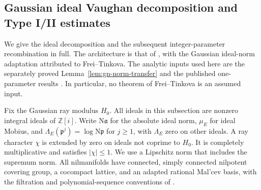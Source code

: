 \subsection{Gaussian ideal Vaughan decomposition and Type I/II estimates}
\label{gi-section}

We give the ideal decomposition and the subsequent integer-parameter
recombination in full.  The architecture is that of
\cite[Section~3]{moebius}, with the Gaussian ideal-norm adaptation
attributed to Frei--Tinkova.  The analytic inputs used here are the
separately proved Lemma~\ref{lem:gn-norm-transfer} and the published
one-parameter results \cite[Theorem~2.9 and Lemma~4.5]{GTOrbits2012}.
In particular, no theorem of Frei--Tinkova is an assumed input.

Fix the Gaussian ray modulus $H_0$.  All ideals in this subsection are
nonzero integral ideals of $\mathbb Z[i]$.  Write $\mathrm N\mathfrak a$
for the absolute ideal norm, $\mu_E$ for ideal Mobius, and
$\Lambda_E(\mathfrak p^j)=\log\mathrm N\mathfrak p$ for $j\geq1$, with
$\Lambda_E$ zero on other ideals.  A ray character $\chi$ is extended by
zero on ideals not coprime to $H_0$.  It is completely multiplicative
and satisfies $|\chi|\leq1$.  We use a Lipschitz norm that includes the
supremum norm.  All nilmanifolds have connected, simply connected
nilpotent covering group, a cocompact lattice, and an adapted rational
Mal'cev basis, with the filtration and polynomial-sequence conventions
of \cite{GTOrbits2012}.

